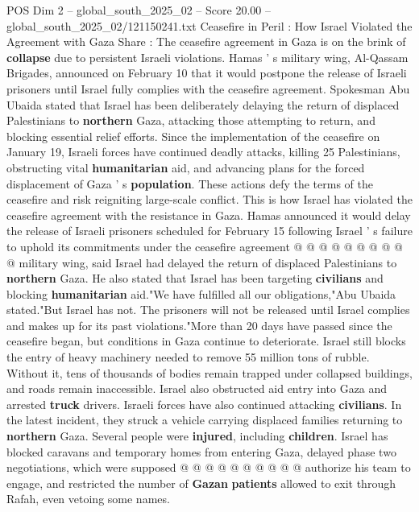 \begin{textsample}{POS Dim 2 – global\_south\_2025\_02 – Score 20.00 – global\_south\_2025\_02/121150241.txt}  \label{ex:f2_pos_424}
Ceasefire in Peril : How Israel Violated the Agreement with Gaza Share : The ceasefire agreement in Gaza is on the brink of \textbf{collapse} due to persistent Israeli violations.
Hamas ' s military wing, Al-Qassam Brigades, announced on February 10 that it would postpone the release of Israeli prisoners until Israel fully complies with the ceasefire agreement.
Spokesman Abu Ubaida stated that Israel has been deliberately delaying the return of displaced Palestinians to \textbf{northern} Gaza, attacking those attempting to return, and blocking essential relief efforts.
Since the implementation of the ceasefire on January 19, Israeli forces have continued deadly attacks, killing 25 Palestinians, obstructing vital \textbf{humanitarian} aid, and advancing plans for the forced displacement of Gaza ' s \textbf{population}.
These actions defy the terms of the ceasefire and risk reigniting large-scale conflict.
This is how Israel has violated the ceasefire agreement with the resistance in Gaza.
Hamas announced it would delay the release of Israeli prisoners scheduled for February 15 following Israel ' s failure to uphold its commitments under the ceasefire agreement @ @ @ @ @ @ @ @ @ @ military wing, said Israel had delayed the return of displaced Palestinians to \textbf{northern} Gaza.
He also stated that Israel has been targeting \textbf{civilians} and blocking \textbf{humanitarian} aid."We have fulfilled all our obligations,"Abu Ubaida stated."But Israel has not.
The prisoners will not be released until Israel complies and makes up for its past violations."More than 20 days have passed since the ceasefire began, but conditions in Gaza continue to deteriorate.
Israel still blocks the entry of heavy machinery needed to remove 55 million tons of rubble.
Without it, tens of thousands of bodies remain trapped under collapsed buildings, and roads remain inaccessible.
Israel also obstructed aid entry into Gaza and arrested \textbf{truck} drivers.
Israeli forces have also continued attacking \textbf{civilians}.
In the latest incident, they struck a vehicle carrying displaced families returning to \textbf{northern} Gaza.
Several people were \textbf{injured}, including \textbf{children}.
Israel has blocked caravans and temporary homes from entering Gaza, delayed phase two negotiations, which were supposed @ @ @ @ @ @ @ @ @ @ authorize his team to engage, and restricted the number of \textbf{Gazan} \textbf{patients} allowed to exit through Rafah, even vetoing some names.

\end{textsample}
